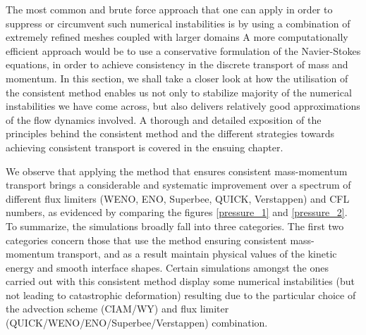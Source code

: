 The most common and brute force approach that one can apply 
in order to suppress or circumvent such numerical instabilities is 
by using a combination of extremely refined meshes coupled with larger domains
A more computationally efficient approach would be to use a 
conservative formulation
of the Navier-Stokes equations, in order
to achieve consistency in the discrete transport of mass and momentum. 
In this section, we shall take a closer look at how the utilisation of 
the consistent method enables us not only to stabilize majority of the numerical
instabilities we have come across, but also delivers relatively good approximations 
of the flow dynamics involved. A thorough and detailed exposition of the principles
behind the consistent method and the different strategies towards achieving consistent
transport is covered in the ensuing chapter.  

We observe that applying the method that ensures consistent mass-momentum 
transport brings a considerable and systematic improvement over a 
spectrum of different flux limiters (WENO, ENO, Superbee, QUICK, Verstappen) 
and CFL numbers, as evidenced by comparing the figures \ref{pressure_1} and \ref{pressure_2}. 
To summarize, the simulations broadly fall into three categories. 
The first two categories concern those that use the method ensuring  
consistent mass-momentum transport, and as a result maintain 
physical values of the kinetic energy and smooth interface shapes. 
Certain simulations amongst the ones carried out with this consistent  
method display some numerical instabilities (but not leading 
to catastrophic deformation)
resulting due to the particular choice of 
the advection scheme (CIAM/WY) and 
flux limiter (QUICK/WENO/ENO/Superbee/Verstappen) combination. 

